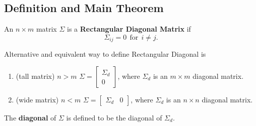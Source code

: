 \subsection{Definition and Main Theorem}

\begin{tcolorbox}[title=\textbf{Rectangular Diagonal Matrix}]

 An $n \times m$ matrix $\Sigma$ is a \textbf{Rectangular Diagonal Matrix} if $$ \Sigma_{ij} = 0~~\text{for}~~ i \ne j.$$

Alternative and equivalent way to define Rectangular Diagonal is 
    \begin{enumerate}
    	\renewcommand{\labelenumi}{(\alph{enumi})}
\setlength{\itemsep}{.2cm}
        \item (tall matrix) $n > m$  \;\;\;  $\Sigma = \left[ \begin{array}{c} \Sigma_{d} \\ 0 \end{array} \right]$, where $\Sigma_{d}$ is an $m \times m$ diagonal matrix.
        \item (wide matrix) $n < m$ \;\;\; $\Sigma = \left[ \begin{array}{cc} \Sigma_{d} & 0 \end{array} \right]$,  where $\Sigma_{d}$ is an $n \times n$ diagonal matrix.
    \end{enumerate}
    
The \textbf{diagonal} of $\Sigma$ is defined to be the diagonal of $ \Sigma_{d}$.\\

\end{tcolorbox}
\vspace*{.2cm}

